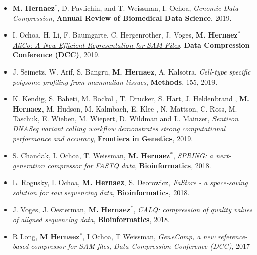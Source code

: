 \documentclass[11pt,a4paper,sans]{moderncv}        %
\begin{document}
\begin{itemize}
\item \textbf{M. Hernaez}$^\ast$, D. Pavlichin, and T. Weissman, I. Ochoa, \emph{Genomic Data Compression}, \textbf{Annual Review of Biomedical Data Science}, 2019. \\

\item I. Ochoa, H. Li, F. Baumgarte, C. Hergenrother, J. Voges, \textbf{M. Hernaez}$^\ast$ \href{}{\emph{ AliCo: A New Efficient Representation for SAM Files}}, {\textbf{ Data Compression Conference (DCC)}}, 2019. \\

\item J. Seimetz, W. Arif, S. Bangru, \textbf{M. Hernaez}, A. Kalsotra, \textsl{Cell-type specific polysome profiling from mammalian tissues}, \textbf{Methods}, 155, 2019.\\

\item K. Kendig, S. Baheti, M. Bockol , T. Drucker, S. Hart, J. Heldenbrand , \textbf{M. Hernaez}, M. Hudson, M. Kalmbach, E. Klee , N. Mattson, C. Ross, M. Taschuk, E. Wieben, M. Wiepert, D. Wildman and L. Mainzer, \textsl{Sentieon DNASeq variant calling workflow demonstrates strong computational performance and accuracy}, \textbf{Frontiers in Genetics}, 2019.\\

\item S. Chandak, I. Ochoa, T. Weissman, \textbf{M. Hernaez}$^\ast$, \href{https://doi.org/10.1093/bioinformatics/bty1015}{\textsl{SPRING: a next-generation compressor for FASTQ data}}, \textbf{Bioinformatics}, 2018.\\

\item L. Rogusky, I. Ochoa, \textbf{M. Hernaez}, S. Deorowicz, \href{https://academic.oup.com/bioinformatics/article/34/16/2748/4956350}{\textsl{FaStore - a space-saving solution for raw sequencing data}}, \textbf{Bioinformatics}, 2018.\\

\item J. Voges, J. Oesterman, \textbf{M. Hernaez}$^\ast$, {\textsl{CALQ: compression of quality values of aligned sequencing data}}, \textbf{Bioinformatics}, 2018.\\

\item R Long, \textbf{M Hernaez}$^\ast$, I Ochoa, T Weissman, \textsl{GeneComp, a new reference-based compressor for SAM files, Data Compression Conference (DCC)}, 2017\\


\end{itemize}
\end{document}
